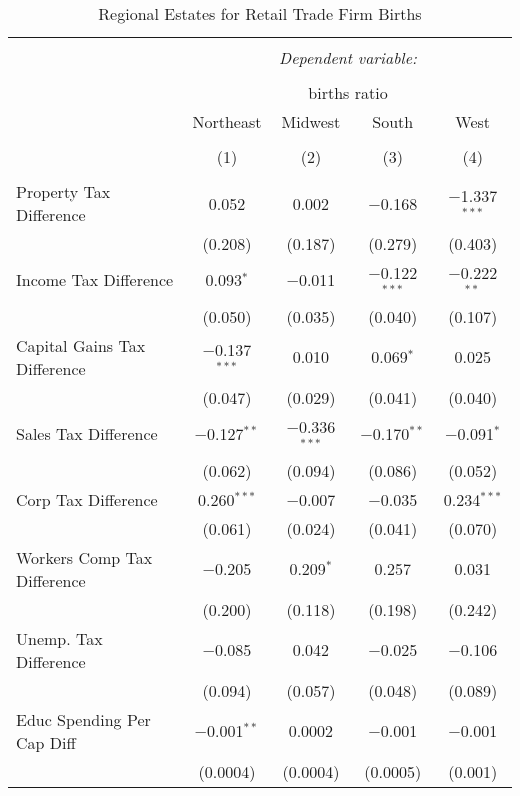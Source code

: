 
\begin{table}[!htbp] \centering 
  \caption{Regional Estates for  Retail Trade Firm Births} 
  \label{} 
\begin{tabular}{@{\extracolsep{5pt}}lcccc} 
\\[-1.8ex]\hline 
\hline \\[-1.8ex] 
 & \multicolumn{4}{c}{\textit{Dependent variable:}} \\ 
\cline{2-5} 
\\[-1.8ex] & \multicolumn{4}{c}{births ratio} \\ 
 & Northeast & Midwest & South & West \\ 
\\[-1.8ex] & (1) & (2) & (3) & (4)\\ 
\hline \\[-1.8ex] 
 Property Tax Difference & 0.052 & 0.002 & $-$0.168 & $-$1.337$^{***}$ \\ 
  & (0.208) & (0.187) & (0.279) & (0.403) \\ 
  Income Tax Difference & 0.093$^{*}$ & $-$0.011 & $-$0.122$^{***}$ & $-$0.222$^{**}$ \\ 
  & (0.050) & (0.035) & (0.040) & (0.107) \\ 
  Capital Gains Tax Difference & $-$0.137$^{***}$ & 0.010 & 0.069$^{*}$ & 0.025 \\ 
  & (0.047) & (0.029) & (0.041) & (0.040) \\ 
  Sales Tax Difference & $-$0.127$^{**}$ & $-$0.336$^{***}$ & $-$0.170$^{**}$ & $-$0.091$^{*}$ \\ 
  & (0.062) & (0.094) & (0.086) & (0.052) \\ 
  Corp Tax Difference & 0.260$^{***}$ & $-$0.007 & $-$0.035 & 0.234$^{***}$ \\ 
  & (0.061) & (0.024) & (0.041) & (0.070) \\ 
  Workers Comp Tax Difference & $-$0.205 & 0.209$^{*}$ & 0.257 & 0.031 \\ 
  & (0.200) & (0.118) & (0.198) & (0.242) \\ 
  Unemp. Tax Difference & $-$0.085 & 0.042 & $-$0.025 & $-$0.106 \\ 
  & (0.094) & (0.057) & (0.048) & (0.089) \\ 
  Educ Spending Per Cap Diff & $-$0.001$^{**}$ & 0.0002 & $-$0.001 & $-$0.001 \\ 
  & (0.0004) & (0.0004) & (0.0005) & (0.001) \\ 

\end{tabular}
\end{table}
